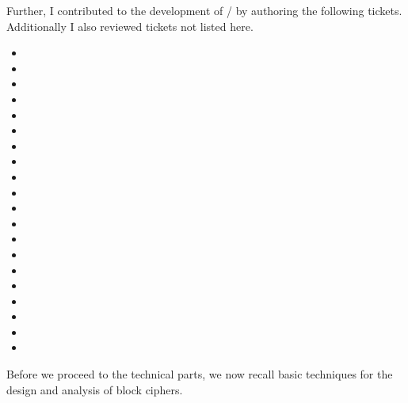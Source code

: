 Further, I contributed to the development of \sage/ by authoring the following tickets.
Additionally I also reviewed tickets not listed here.
\begin{itemize}
    \setlength\itemsep{0em}
    \item[] 
    \item[] 
    \item[] 
    \item[] 
    \item[] 
    \item[] 
    \item[] 
    \item[] 
    \item[] 
    \item[] 
    \item[] 
    \item[] 
    \item[] 
    \item[] 
    \item[] 
    \item[] 
    \item[] 
    \item[] 
    \item[] 
    \item[] 
\end{itemize}

Before we proceed to the technical parts, we now recall basic techniques for the design and analysis of block ciphers.
